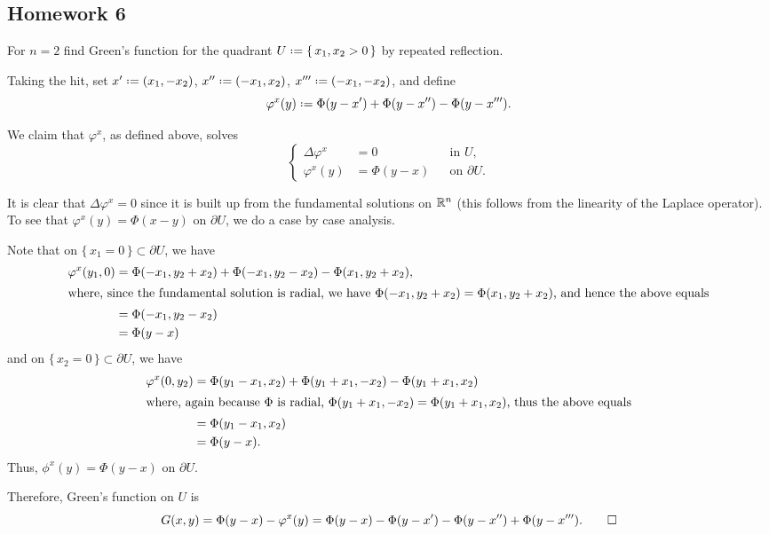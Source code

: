\subsection{Homework 6}
\begin{problem}
  For \(n=2\) find Green's function for the quadrant
  \(U\defeq\{\,x_1,x_2>0\,\}\) by repeated reflection.
\end{problem}
\begin{solution*}
  Taking the hit, set \(x'\defeq(x_1,-x_2)\), \(x''\defeq(-x_1,x_2)\),
  \(x'''\defeq(-x_1,-x_2)\), and define
  \begin{equation}
    \label{eq:6:corrector}
    \varphi^x(y)\defeq\Phi(y-x')+\Phi(y-x'')-\Phi(y-x''').
  \end{equation}

  We claim that \(\varphi^x\), as defined above, solves
  \[
    \left\{
      \begin{aligned}
        \Delta\varphi^x&=0&&\text{in \(U\),}\\
        \varphi^x(y)&=\Phi(y-x)&&\text{on \(\partial U\).}
      \end{aligned}
    \right.
  \]

  It is clear that \(\Delta\varphi^x=0\) since it is built up from the
  fundamental solutions on \(\mathbb{R}^n\) (this follows from the linearity of
  the Laplace operator). To see that \(\varphi^x(y)=\Phi(x-y)\) on
  \(\partial U\), we do a case by case analysis.

  Note that on \(\{\,x_1=0\,\}\subset\partial U\), we have
  \begin{align*}
    \varphi^x(y_1,0)
    &=\Phi(-x_1,y_2+x_2)+\Phi(-x_1,y_2-x_2)-\Phi(x_1,y_2+x_2),\\
    \intertext{where, since the fundamental solution is radial, we have
    \(\Phi(-x_1,y_2+x_2)=\Phi(x_1,y_2+x_2)\), and hence the above equals}
    &=\Phi(-x_1,y_2-x_2)\\
    &=\Phi(y-x)
  \end{align*}
  and on \(\{\,x_2=0\,\}\subset\partial U\), we have
  \begin{align*}
    \varphi^x(0,y_2)
    &=\Phi(y_1-x_1,x_2)+\Phi(y_1+x_1,-x_2)-\Phi(y_1+x_1,x_2)\\
    \intertext{where, again because \(\Phi\) is radial,
    \(\Phi(y_1+x_1,-x_2)=\Phi(y_1+x_1,x_2)\), thus the above equals}
    &=\Phi(y_1-x_1,x_2)\\
    &=\Phi(y-x).
  \end{align*}
  Thus, \(\phi^x(y)=\Phi(y-x)\) on \(\partial U\).

  Therefore, Green's function on \(U\) is
  \[
    G(x,y)
    =\Phi(y-x)-\varphi^x(y)%
    =\Phi(y-x)-\Phi(y-x')-\Phi(y-x'')+\Phi(y-x''').%
    \qedhere
  \]
\end{solution*}

